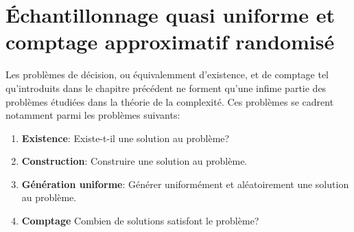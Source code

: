 \chapter{Échantillonnage quasi uniforme et comptage approximatif randomisé}

Les problèmes de décision, ou équivalemment d'existence, et de comptage tel qu'introduits dans le chapitre précédent ne forment qu'une infime partie des problèmes étudiées dans la théorie de la complexité. Ces problèmes se cadrent notamment parmi les problèmes suivants:

\begin{enumerate}[(1)]
    \item \textbf{Existence}: Existe-t-il une solution au problème?
    \item \textbf{Construction}: Construire une solution au problème.
    \item \textbf{Génération uniforme}: Générer uniformément et aléatoirement une solution au problème.
    \item \textbf{Comptage} Combien de solutions satisfont le problème?
\end{enumerate}

